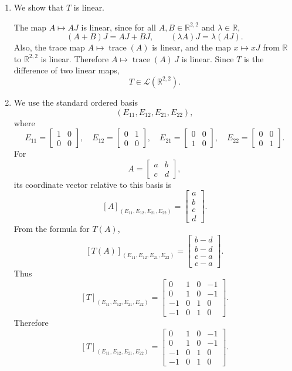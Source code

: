 \documentclass[12pt]{article}
\newcommand{\R}{\mathbb{R}}
\newcommand{\cL}{\mathcal{L}}
\DeclareMathOperator{\tr}{trace}
\begin{document}
\begin{enumerate}[label=(\alph*)]
\item We show that \(T\) is linear.

The map \(A\mapsto AJ\) is linear, since for all \(A,B\in \R^{2,2}\) and \(\lambda\in\R\),
\[
(A+B)J=AJ+BJ,
\qquad
(\lambda A)J=\lambda(AJ).
\]
Also, the trace map \(A\mapsto \tr(A)\) is linear, and the map \(x\mapsto xJ\) from \(\R\) to \(\R^{2,2}\) is linear. Therefore \(A\mapsto \tr(A)\,J\) is linear. Since \(T\) is the difference of two linear maps,
\[
T\in \cL(\R^{2,2}).
\]

\item We use the standard ordered basis
\[
(E_{11},E_{12},E_{21},E_{22}),
\]
where
\[
E_{11}=\begin{bmatrix}1&0\\0&0\end{bmatrix},\quad
E_{12}=\begin{bmatrix}0&1\\0&0\end{bmatrix},\quad
E_{21}=\begin{bmatrix}0&0\\1&0\end{bmatrix},\quad
E_{22}=\begin{bmatrix}0&0\\0&1\end{bmatrix}.
\]
For
\[
A=\begin{bmatrix}a&b\\c&d\end{bmatrix},
\]
its coordinate vector relative to this basis is
\[
[A]_{(E_{11},E_{12},E_{21},E_{22})}
=
\begin{bmatrix}a\\b\\c\\d\end{bmatrix}.
\]
From the formula for \(T(A)\),
\[
[T(A)]_{(E_{11},E_{12},E_{21},E_{22})}
=
\begin{bmatrix}
b-d\\
b-d\\
c-a\\
c-a
\end{bmatrix}.
\]
Thus
\[
[T]_{(E_{11},E_{12},E_{21},E_{22})}
=
\begin{bmatrix}
0&1&0&-1\\
0&1&0&-1\\
-1&0&1&0\\
-1&0&1&0
\end{bmatrix}.
\]
Therefore
\[
\boxed{
[T]_{(E_{11},E_{12},E_{21},E_{22})}
=
\begin{bmatrix}
0&1&0&-1\\
0&1&0&-1\\
-1&0&1&0\\
-1&0&1&0
\end{bmatrix}.}
\]


\end{enumerate}
\end{document}
